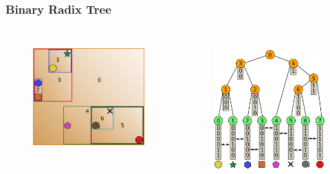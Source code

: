 \documentclass{beamer}
\begin{document}
\begin{frame}
  \frametitle{Binary Radix Tree}
  
\begin{columns}[t]

\begin{figure}
\includegraphics[height=45mm]{primitive-box.png}
\end{figure}

\begin{figure}
\includegraphics[height=55mm]{full_radix_tree_narrow.png}
\end{figure}
\end{columns}
\end{frame}
\end{document}
